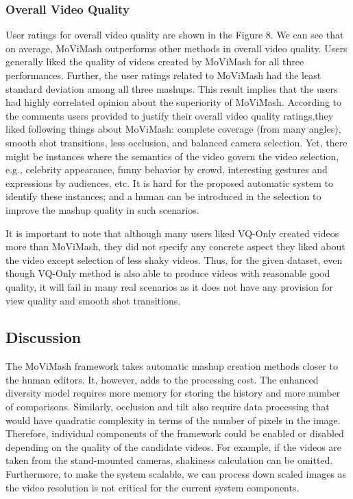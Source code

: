 \documentclass{sig-alternate}
\begin{document}
\subsubsection{ Overall Video Quality}
User ratings for overall video quality are shown in the Figure 8. We can see that on average, MoViMash outperforms other methods in overall video quality. Users generally liked the quality of videos created by MoViMash for all three performances. Further, the user ratings related to MoViMash had the least standard deviation among all three mashups. This result implies that the users had highly correlated opinion about the superiority of MoViMash. According to the comments users provided to justify their overall video quality ratings,they liked following things about MoViMash: complete coverage (from many angles), smooth shot transitions, less occlusion, and balanced camera selection. Yet, there might be instances where the semantics of the video govern the video selection, e.g., celebrity appearance, funny behavior by crowd, interesting gestures and expressions by audiences, etc. It is hard for the proposed automatic system to identify these instances; and a human can be introduced in the selection to improve the mashup quality in such scenarios.

It is important to note that although many users liked VQ-Only created videos more than MoViMash, they did not specify any concrete aspect they liked about the video except selection of less shaky videos. Thus, for the given dataset, even though VQ-Only method is also able to produce videos with reasonable good quality, it will fail in many real scenarios as it does not have any provision for view quality and smooth shot transitions.

\subsection{Discussion}
The MoViMash framework takes automatic mashup creation methods closer to the human editors. It, however, adds to the processing cost. The enhanced diversity model requires more memory for storing the history and more number of comparisons. Similarly, occlusion and tilt also require data processing that would have quadratic complexity in terms of the number of pixels in the image. Therefore, individual components of the framework could be enabled or disabled depending on the quality of the candidate videos. For example, if the videos are taken from the stand-mounted cameras, shakiness calculation can be omitted. Furthermore, to make the system scalable, we can process down scaled images as the video resolution is not critical for the current system components.
\end{document}
